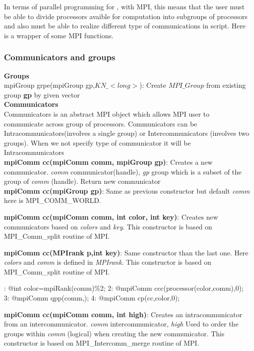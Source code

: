 \documentclass[a4paper,twoside,12pt]{book}
\begin{document}
In terms of parallel programming for \freefempp, with MPI, this means that the user
must be able to divide processors  avaible for computation into subgroups of
processors and also must be able to realize different type of communications in
\freefempp  script. Here is a wrapper of some MPI functions.
\subsubsection{Communicators and groups}
\textbf{Groups}\\
mpiGroup grpe(mpiGroup gp,$KN\_<long>$): Create $MPI\_Group$  from  existing group \textbf{gp} by
given vector \\

\textbf{Communicators}\\
Communicators is an abstract MPI object which allows MPI user to communicate
across group of processors. Communicators can be
Intra\-communicators(involves a single group) or Inter\-communicators (involves
two groups). When we not specify type of communicator it will be Intra\-communicators\\



\textbf{mpiComm cc(mpiComm comm, mpiGroup gp)}: Creates a new communicator.
\textit{comm} communicator(handle), \textit{gp} group which is a subset of the
group of \textit{comm} (handle). Return new communicator  \\

\textbf{mpiComm cc(mpiGroup gp)}: Same as previous constructor but default
\textit{comm} here is MPI\_COMM\_WORLD.

\textbf{mpiComm cc(mpiComm comm, int color, int key)}: Creates new communicators
based on \textit{colors} and \textit{key}. This constructor is based on
MPI\_Comm\_split routine of MPI.


\textbf{mpiComm cc(MPIrank p,int key)}:  Same constructor than the last one.
Here \textit{colors} and \textit{comm} is defined in \textit{MPIrank}. This
constructor is based on MPI\_Comm\_split routine of MPI.
\begin{example}\label{comm:comm}
: @int color=mpiRank(comm)\%2;
2: @mpiComm ccc(processor(color,comm),0);
3: @mpiComm qpp(comm,);
4: @mpiComm cp(cc,color,0);
\eFF
\end{example}

\textbf{mpiComm cc(mpiComm comm, int high)}: Creates an intracommunicator from
an intercommunicator. \textit{comm} intercommunicator,
\textit{high} Used to order the groups within \textit{comm} (logical) when
creating the new communicator. This constructor is based on
MPI\_Intercomm\_merge routine of MPI.
\end{document}
